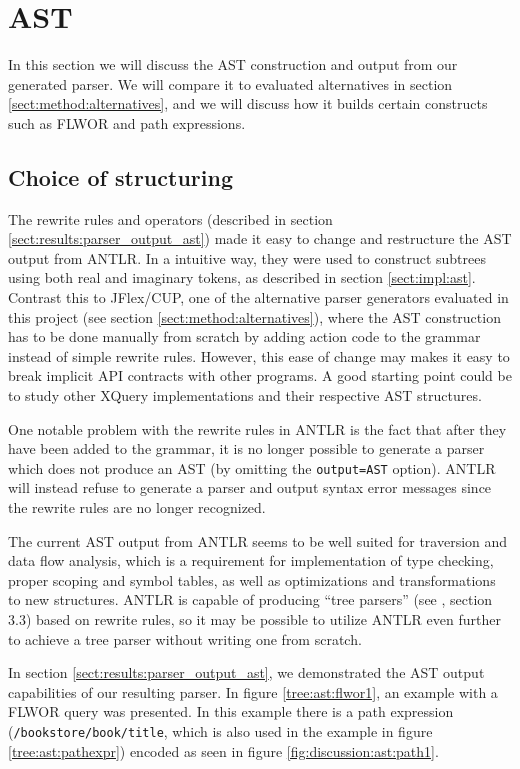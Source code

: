 \section{AST}
\label{sect:discussion:ast}
In this section we will discuss the AST construction and output from our generated
parser. We will compare it to evaluated alternatives in section
\ref{sect:method:alternatives}, and we will discuss how it builds certain
constructs such as FLWOR and path expressions.

\subsection{Choice of structuring}
The rewrite rules and operators (described in section
\ref{sect:results:parser_output_ast}) made it easy to change and restructure the
AST output from ANTLR. In a intuitive way, they were used to construct subtrees
using both real and imaginary tokens, as described in section
\ref{sect:impl:ast}. Contrast this to JFlex/CUP, one of the alternative
parser generators evaluated in this project (see section
\ref{sect:method:alternatives}), where the AST construction has to be done
manually from scratch by adding action code to the grammar instead of simple
rewrite rules. However, this ease of change may makes it easy to break implicit
API contracts with other programs. A good starting point could be to study other
XQuery implementations and their respective AST structures. 

One notable problem with the rewrite rules in ANTLR is the fact that after they
have been added to the grammar, it is no longer possible to generate a parser
which does not produce an AST (by omitting the \verb!output=AST! option). ANTLR will
instead refuse to generate a parser and output syntax error messages since the rewrite
rules are no longer recognized.

The current AST output from ANTLR seems to be well suited for traversion and data
flow analysis, which is a requirement for implementation of type checking,
proper scoping and symbol tables, as well as optimizations and transformations
to new structures. ANTLR is capable of producing ``tree parsers'' (see
\cite{definitiveAntlr}, section 3.3) based on rewrite rules, so it may be
possible to utilize ANTLR even further to achieve a tree
parser without writing one from scratch.

In section \ref{sect:results:parser_output_ast}, we demonstrated the AST output
capabilities of our resulting parser. In figure \ref{tree:ast:flwor1}, an
example with a FLWOR query was presented. In this example there is a path
expression (\verb!/bookstore/book/title!, which is also used in the example in
figure \ref{tree:ast:pathexpr}) encoded as seen in figure
\ref{fig:discussion:ast:path1}. 

